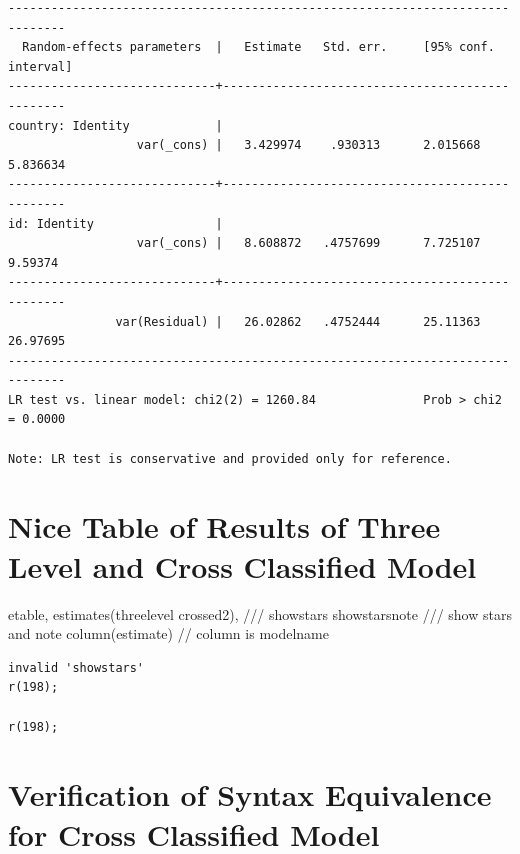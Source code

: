 \documentclass[
  letterpaper,
  DIV=11,
  numbers=noendperiod]{scrreprt}
\newenvironment{Shaded}{\begin{snugshade}}{\end{snugshade}}
\newcommand{\CommentTok}[1]{\textcolor[rgb]{0.37,0.37,0.37}{#1}}
\newcommand{\KeywordTok}[1]{\textcolor[rgb]{0.00,0.23,0.31}{#1}}
\newcommand{\NormalTok}[1]{\textcolor[rgb]{0.00,0.23,0.31}{#1}}
\begin{document}
\begin{verbatim}
------------------------------------------------------------------------------
  Random-effects parameters  |   Estimate   Std. err.     [95% conf. interval]
-----------------------------+------------------------------------------------
country: Identity            |
                  var(_cons) |   3.429974    .930313      2.015668    5.836634
-----------------------------+------------------------------------------------
id: Identity                 |
                  var(_cons) |   8.608872   .4757699      7.725107     9.59374
-----------------------------+------------------------------------------------
               var(Residual) |   26.02862   .4752444      25.11363    26.97695
------------------------------------------------------------------------------
LR test vs. linear model: chi2(2) = 1260.84               Prob > chi2 = 0.0000

Note: LR test is conservative and provided only for reference.
\end{verbatim}

\section{Nice Table of Results of Three Level and Cross Classified
Model}\label{nice-table-of-results-of-three-level-and-cross-classified-model}

\begin{Shaded}
\begin{Highlighting}[]

\NormalTok{etable, }\KeywordTok{estimates}\NormalTok{(threelevel crossed2), }\CommentTok{///}
\NormalTok{showstars showstarsnote }\CommentTok{/// show stars and note}
\NormalTok{column(estimate) }\CommentTok{// column is modelname}
\end{Highlighting}
\end{Shaded}

\begin{verbatim}
invalid 'showstars' 
r(198);

r(198);
\end{verbatim}

\section{Verification of Syntax Equivalence for Cross Classified
Model}\label{verification-of-syntax-equivalence-for-cross-classified-model}
\end{document}
